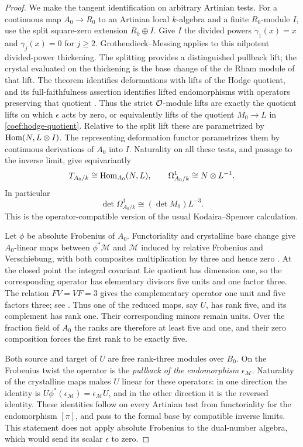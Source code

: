 \begin{proof}
We make the tangent identification on arbitrary Artinian tests.
For a continuous map \(A_0\to R_0\) to an Artinian local
\(k\)-algebra and a finite \(R_0\)-module \(I\), use the split
square-zero extension \(R_0\oplus I\).
Give \(I\) the divided powers \(\gamma_1(x)=x\) and
\(\gamma_j(x)=0\) for \(j\ge2\).
Grothendieck--Messing applies to this nilpotent divided-power
thickening.  The splitting provides a distinguished pullback lift;
the crystal evaluated on the thickening is the base change of
the de Rham module of that lift.
The theorem identifies deformations with lifts of the Hodge
quotient, and its full-faithfulness assertion identifies lifted
endomorphisms with operators preserving that quotient
\cite[Remark~2.3(iii), Theorem~2.4(ii),(iv)]{ChaiOort}.
Thus the strict \(\mathcal O\)-module lifts are exactly the quotient
lifts on which \(\epsilon\) acts by zero, or equivalently lifts of
the quotient \(M_0\to L\) in \eqref{coef:hodge-quotient}.
Relative to the split lift these are parametrized by
\(\operatorname{Hom}(N,L\otimes I)\).
The representing deformation functor parametrizes them by
continuous derivations of \(A_0\) into \(I\).
Naturality on all these tests, and passage to the inverse limit,
give equivariantly
\[
 T_{A_0/k}\cong\operatorname{Hom}_{A_0}(N,L),\qquad
 \Omega^1_{A_0/k}\cong N\otimes L^{-1}.
\]
In particular
\begin{equation}\label{coef:canonical-line}
 \det\Omega^1_{A_0/k}\cong(\det M_0)L^{-3}.
\end{equation}
This is the operator-compatible version of the usual
Kodaira--Spencer calculation.

Let \(\phi\) be absolute Frobenius of \(A_0\).
Functoriality and crystalline base change give \(A_0\)-linear
maps between \(\phi^*\mathcal M\) and \(\mathcal M\) induced by
relative Frobenius and Verschiebung, with both composites multiplication
by three and hence zero
\cite[Section~2.2, Equation~(2.4), pp.~24--25]{BerthelotMessing}.
At the closed point the integral covariant Lie quotient has dimension
one, so the corresponding operator has elementary divisors five units
and one factor three.  The relation \(FV=VF=3\) gives the complementary
operator one unit and five factors three; see
\cite[Theorem~4.33(3) and Remark~4.34(2)]{ChaiOort}.
Thus one of the reduced maps, say \(U\), has rank five, and its
complement has rank one.  Their corresponding minors remain units.  Over the
fraction field of \(A_0\) the ranks are therefore at least five
and one, and their zero composition forces the first rank to
be exactly five.

Both source and target of \(U\) are free rank-three modules over
\(B_0\).  On the Frobenius twist the operator is the
\emph{pullback of the endomorphism} \(\epsilon_{\mathcal M}\).
Naturality of the crystalline maps makes \(U\) linear for these
operators: in one direction the identity is
\(U\phi^*(\epsilon_{\mathcal M})=\epsilon_{\mathcal M}U\),
and in the other direction it is the reversed identity.
These identities follow on every Artinian test from functoriality
for the endomorphism \([\pi]\), and pass to the formal base by
compatible inverse limits.  This statement does not apply absolute Frobenius
to the dual-number algebra, which would send its scalar
\(\epsilon\) to zero.


\end{proof}
